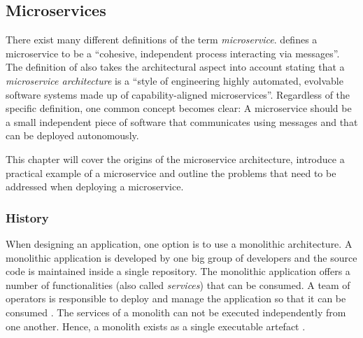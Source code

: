
\subsection{Microservices}%
\label{sub:Microservices}

There exist many different definitions of the term \textit{microservice}.
\autocite{DragoniMicroservicesyesterdaytoday2016} defines a microservice to be
a \enquote{cohesive, independent process interacting via messages}. The
definition of \autocite{MikeAmundsenMicroserviceArchitecture2016} also takes
the architectural aspect into account stating that a \textit{microservice
architecture} is a \enquote{style of engineering highly automated, evolvable
software systems made up of capability-aligned microservices}. Regardless of
the specific definition, one common concept becomes clear: A microservice
should be a small independent piece of software that communicates using
messages and that can be deployed autonomously.

This chapter will cover the origins of the microservice architecture, introduce
a practical example of a microservice and outline the problems that need to be
addressed when deploying a microservice.

\subsubsection{History}%
\label{ssub:History}

When designing an application, one option is to use a monolithic architecture.
A monolithic application is developed by one big group of developers and the
source code is maintained inside a single repository. The monolithic
application offers a number of functionalities (also called \textit{services})
that can be consumed. A team of operators is responsible to deploy and manage
the application so that it can be consumed \autocite[p.
584]{VillamizarEvaluatingmonolithicmicroservice2015}. The services of a
monolith can not be executed independently from one another. Hence, a monolith
exists as a single executable artefact \autocite[p.
1]{DragoniMicroservicesyesterdaytoday2016}.


